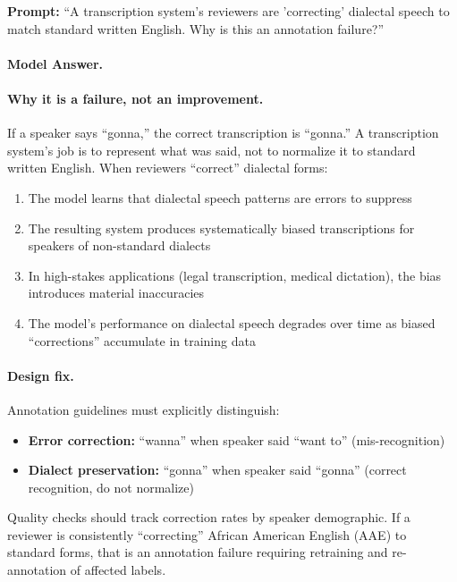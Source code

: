\textbf{Prompt:} ``A transcription system's reviewers are 'correcting' dialectal speech to match standard written English. Why is this an annotation failure?''

\paragraph{Model Answer.}

\paragraph{Why it is a failure, not an improvement.}

If a speaker says ``gonna,'' the correct transcription is ``gonna.'' A transcription system's job is to represent what was said, not to normalize it to standard written English. When reviewers ``correct'' dialectal forms:

\begin{enumerate}
    \item The model learns that dialectal speech patterns are errors to suppress
    \item The resulting system produces systematically biased transcriptions for speakers of non-standard dialects
    \item In high-stakes applications (legal transcription, medical dictation), the bias introduces material inaccuracies
    \item The model's performance on dialectal speech degrades over time as biased ``corrections'' accumulate in training data
\end{enumerate}

\paragraph{Design fix.}

Annotation guidelines must explicitly distinguish:
\begin{itemize}
    \item \textbf{Error correction:} ``wanna'' when speaker said ``want to'' (mis-recognition)
    \item \textbf{Dialect preservation:} ``gonna'' when speaker said ``gonna'' (correct recognition, do not normalize)
\end{itemize}

Quality checks should track correction rates by speaker demographic. If a reviewer is consistently ``correcting'' African American English (AAE) to standard forms, that is an annotation failure requiring retraining and re-annotation of affected labels.

